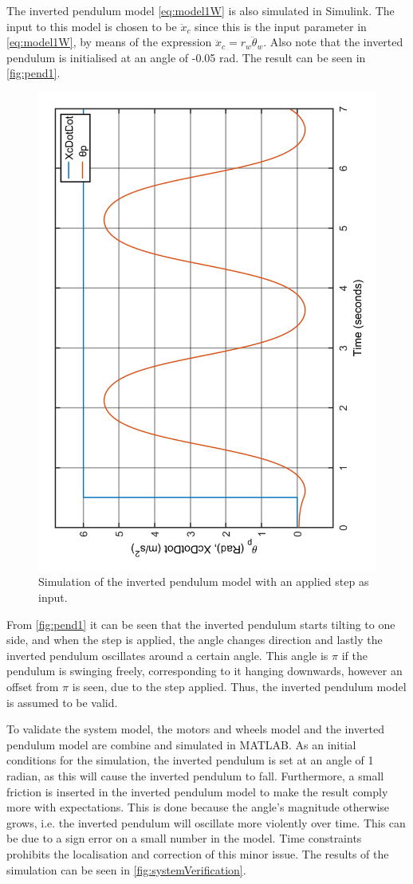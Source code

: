 The inverted pendulum model \autoref{eq:model1W} is also simulated in Simulink. The input to this model is chosen to be $\ddot{x}_c$ since this is the input parameter in \autoref{eq:model1W}, by means of the expression $\ddot{x}_c = r_w\ddot{\theta}_w$. Also note that the inverted pendulum is initialised at an angle of -0.05 rad. The result can be seen in \autoref{fig:pend1}.
\begin{figure}[H]
\centering
\includegraphics[height = 0.75\textwidth, angle = -90]{figures/pend1.pdf}
\caption{Simulation of the inverted pendulum model with an applied step as input.}
\label{fig:pend1}
\end{figure}

From \autoref{fig:pend1} it can be seen that the inverted pendulum starts tilting to one side, and when the step is applied, the angle changes direction and lastly the inverted pendulum oscillates around a certain angle. This angle is $\pi$ if the pendulum is swinging freely, corresponding to it hanging downwards, however an offset from $\pi$ is seen, due to the step applied. Thus, the inverted pendulum model is assumed to be valid.

To validate the system model, the motors and wheels model and the inverted pendulum model are combine and simulated in MATLAB. As an initial conditions for the simulation, the inverted pendulum is set at an angle of 1 radian, as this will cause the inverted pendulum to fall. Furthermore, a small friction is inserted in the inverted pendulum model to make the result comply more with expectations. This is done because the angle's magnitude otherwise grows, i.e. the inverted pendulum will oscillate more violently over time. This can be due to a sign error on a small number in the model. Time constraints prohibits the localisation and correction of this minor issue. The results of the simulation can be seen in \autoref{fig:systemVerification}.

